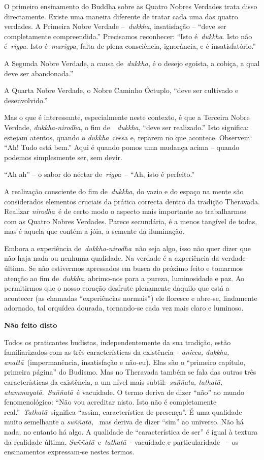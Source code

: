 O primeiro ensinamento do Buddha sobre as Quatro Nobres Verdades trata
disso directamente. Existe uma maneira diferente de tratar cada uma das
quatro verdades. A Primeira Nobre Verdade --~\emph{dukkha}, insatisfação
-- ``deve ser completamente compreendida.'' Precisamos reconhecer:
``Isto é~\emph{dukkha}. Isto não é~\emph{rigpa}. Isto é~\emph{marigpa},
falta de plena consciência, ignorância, e é insatisfatório.''

A Segunda Nobre Verdade, a causa de~\emph{dukkha}, é o desejo egoísta, a
cobiça, a qual deve ser abandonada.''

A Quarta Nobre Verdade, o Nobre Caminho Óctuplo, ``deve ser cultivado e
desenvolvido.''

Mas o que é interessante, especialmente neste contexto, é que a Terceira
Nobre Verdade, \emph{dukkha-nirodha}, o fim de~~\emph{dukkha}, ``deve
ser realizado.'' Isto significa: estejam atentos, quando o
\emph{dukkha}~cessa e, reparem no que acontece. Observem: ``Ah! Tudo
está bem.'' Aqui é quando pomos uma mudança acima -- quando podemos
simplesmente ser, sem devir.

``Ah ah'' -- o sabor do néctar de~\emph{rigpa}~-- ``Ah, isto é
perfeito.''

A realização consciente do fim de~\emph{dukkha}, do vazio e do espaço na
mente são considerados elementos cruciais da prática correcta dentro da
tradição Theravada. Realizar \emph{nirodha}~é de certo modo o aspecto
mais importante ao trabalharmos com as Quatro Nobres Verdades. Parece
secundária, é a menos tangível de todas, mas é aquela que contém a jóia,
a semente da iluminação.

Embora a experiência de~\emph{dukkha-nirodha}~não seja algo, isso não
quer dizer que não haja nada ou nenhuma qualidade. Na verdade é a
experiência da verdade última. Se não estivermos apressados em busca do
próximo feito e tomarmos atenção ao fim de~\emph{dukkha}, abrimo-nos
para a pureza, luminosidade e paz. Ao permitirmos que o nosso coração
desfrute plenamente daquilo que está a acontecer (as chamadas
``experiências normais'') ele floresce e abre-se, lindamente adornado,
tal orquídea dourada, tornando-se cada vez mais claro e luminoso.

\textbf{Não feito disto}

Todos os praticantes budistas, independentemente da sua tradição, estão
familiarizados com as três características da existência -~\emph{anicca,
dukkha, anattā}~(impermanência, insatisfação e não-eu). Elas são o
``primeiro capítulo, primeira página'' do Budismo. Mas no Theravada
também se fala das outras três características da existência, a um nível
mais subtil:~\emph{suññata, tathatā, atammayatā}.~\emph{Suññatā}~é
vacuidade. O termo deriva de dizer ``não'' ao mundo fenomenológico:
``Não vou acreditar nisto. Isto não é completamente
real.''~\emph{Tathatā}~significa ``assim, característica de presença''.
É uma qualidade muito semelhante a \emph{suññatā,} ~mas deriva de dizer
``sim'' ao universo. Não há nada, no entanto há algo. A qualidade de
``característica de ser'' é igual à textura da realidade última.
\emph{Suññatā}~e~\emph{tathatā}~- vacuidade e particularidade ~-- os
ensinamentos expressam-se nestes termos.

